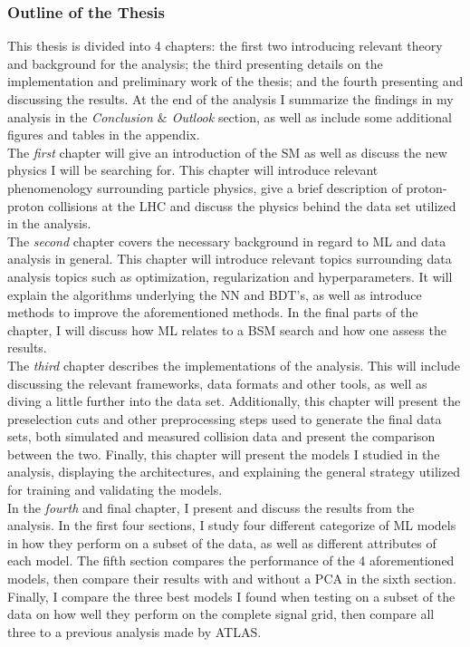 \subsubsection*{Outline of the Thesis}
This thesis is divided into 4 chapters: the first two introducing relevant theory and background for the analysis; the third presenting 
details on the implementation and preliminary work of the thesis; and the fourth presenting and discussing the results. At the end of the analysis I summarize 
the findings in my analysis in the \emph{Conclusion $\&$ Outlook} section, as well as include some additional figures and tables 
in the appendix. 
\\
The \emph{first} chapter will give an introduction of the \ac{SM} as well as discuss the new physics I will be searching for. This chapter will 
introduce relevant phenomenology surrounding particle physics, give a brief description of proton-proton collisions at the \ac{LHC} and discuss 
the physics behind the data set utilized in the analysis. 
\\
The \emph{second} chapter covers the necessary background in regard to \ac{ML} and data analysis in general. This chapter will introduce relevant topics
surrounding data analysis topics such as optimization, regularization and hyperparameters. It will explain the algorithms underlying the \ac{NN} and 
\ac{BDT}'s, as well as introduce methods to improve the aforementioned methods. In the final parts of the chapter, I will discuss how \ac{ML} relates to 
a \ac{BSM} search and how one assess the results.
\\
The \emph{third} chapter describes the implementations of the analysis. This will include discussing the relevant frameworks, data formats and 
other tools, as well as diving a little further into the data set. Additionally, this chapter will present the preselection cuts and other preprocessing steps
used to generate the final data sets, both simulated and measured collision data and present the comparison between the two. Finally, this chapter will present the 
models I studied in the analysis, displaying the architectures, and explaining the general strategy utilized for training and validating the models.
\\
In the \emph{fourth} and final chapter, I present and discuss the results from the analysis. In the first four sections, I study four different categorize of \ac{ML} models in how they 
perform on a subset of the data, as well as different attributes of each model. The fifth section compares the performance of the 4 aforementioned models, then compare 
their results with and without a \acs{PCA} in the sixth section. Finally, I compare the three best models I found when testing on a subset of the data on how well they perform 
on the complete signal grid, then compare all three to a previous analysis made by \acs{ATLAS}.



